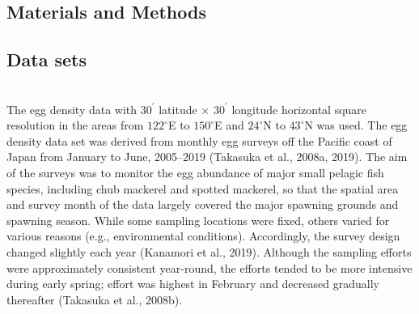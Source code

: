 \documentclass[12pt]{article}
\begin{document}
\begin{linenumbers}
{\section{Materials and Methods}
\subsection{Data sets}
\\
The egg density data with $\textrm{30}^\prime$ latitude $\times$ $\textrm{30}^\prime$ longitude horizontal square resolution in the areas from $\textrm{122}^\circ$E to $\textrm{150}^\circ$E and $\textrm{24}^\circ$N to $\textrm{43}^\circ$N was used. The egg density data set was derived from monthly egg surveys off the Pacific coast of Japan from January to June, 2005--2019 (Takasuka et al., 2008a, 2019). The aim of the surveys was to monitor the egg abundance of major small pelagic fish species, including chub mackerel and spotted mackerel, so that the spatial area and survey month of the data largely covered the major spawning grounds and spawning season. While some sampling locations were fixed, others varied for various reasons (e.g., environmental conditions). Accordingly, the survey design changed slightly each year (Kanamori et al., 2019). Although the sampling efforts were approximately consistent year-round, the efforts tended to be more intensive during early spring; effort was highest in February and decreased gradually thereafter (Takasuka et al., 2008b). 

}
\end{linenumbers}
\end{document}
